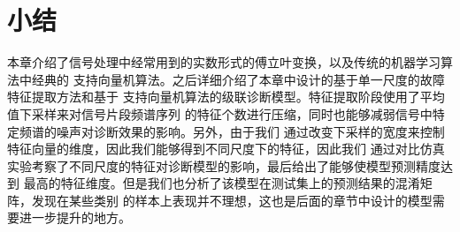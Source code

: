 \section{小结}

本章介绍了信号处理中经常用到的实数形式的傅立叶变换，以及传统的机器学习算法中经典的
支持向量机算法。之后详细介绍了本章中设计的基于单一尺度的故障特征提取方法和基于
支持向量机算法的级联诊断模型。特征提取阶段使用了平均值下采样来对信号片段频谱序列
的特征个数进行压缩，同时也能够减弱信号中特定频谱的噪声对诊断效果的影响。另外，由于我们
通过改变下采样的宽度来控制特征向量的维度，因此我们能够得到不同尺度下的特征，因此我们
通过对比仿真实验考察了不同尺度的特征对诊断模型的影响，最后给出了能够使模型预测精度达到
最高的特征维度。但是我们也分析了该模型在测试集上的预测结果的混淆矩阵，发现在某些类别
的样本上表现并不理想，这也是后面的章节中设计的模型需要进一步提升的地方。
